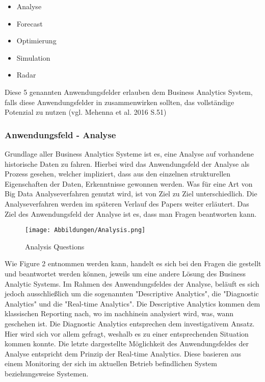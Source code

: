 \documentclass[12pt,twocolumn,twoside]{conference}   %
\begin{document}
\begin{itemize}
\item Analyse
\item Forecast
\item Optimierung
\item Simulation
\item Radar
\end{itemize}

Diese 5 genannten Anwendungsfelder erlauben dem Business Analytics System, falls diese Anwendungsfelder in zusammenwirken sollten, das vollständige Potenzial zu nutzen (vgl. Mehenna et al. 2016 S.51) 

\subsubsection{Anwendungsfeld - Analyse}
Grundlage aller Business Analytics Systeme ist es, eine Analyse auf vorhandene historische Daten zu fahren. Hierbei wird das Anwendungsfeld der Analyse als Prozess gesehen, welcher impliziert, dass aus den einzelnen strukturellen Eigenschaften der Daten, Erkenntnisse gewonnen werden. Was für eine Art von Big Data Analyseverfahren genutzt wird, ist von Ziel zu Ziel unterschiedlich. Die Analyseverfahren werden im späteren Verlauf des Papers weiter erläutert. Das Ziel des Anwendungsfeld der Analyse ist es, dass man Fragen beantworten kann. 

\begin{@twocolumnfalse}
\begin{figure}[H]
\centering
\texttt{[image: Abbildungen/Analysis.png]}
\caption{Analysis Questions}\label{visina8}
\end{figure}
\end{@twocolumnfalse}

Wie Figure 2 entnommen werden kann, handelt es sich bei den Fragen die gestellt und beantwortet werden können, jeweils um eine andere Lösung des Business Analytic Systems. Im Rahmen des Anwendungsfeldes der Analyse, beläuft es sich jedoch ausschließlich um die sogenannten "Descriptive Analytics", die "Diagnostic Analytics" und die "Real-time Analytics". Die Descriptive Analytics kommen dem klassischen Reporting nach, wo im nachhinein analysiert wird, was, wann geschehen ist. Die Diagnostic Analytics entsprechen dem investigativem Ansatz. Hier wird sich vor allem gefragt, weshalb es zu einer entsprechenden Situation kommen konnte. Die letzte dargestellte Möglichkeit des Anwendungsfeldes der Analyse entspricht dem Prinzip der Real-time Analytics. Diese basieren aus einem Monitoring der sich im aktuellen Betrieb befindlichen System beziehungsweise Systemen. 
\end{document}
